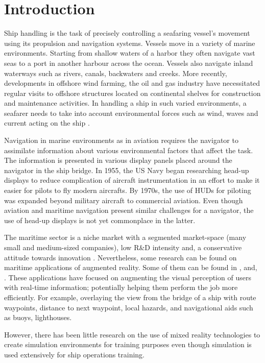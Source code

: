 \chapter{Introduction}

Ship handling is the task of precisely controlling a seafaring vessel’s movement using its propulsion and navigation systems. Vessels move in a variety of marine environments. Starting from shallow waters of a harbor they often navigate vast seas to a port in another harbour across the ocean. Vessels also navigate inland waterways such as rivers, canals, backwaters and creeks. More recently, developments in offshore wind farming, the oil and gas industry have necessitated regular visits to offshore structures located on continental shelves for construction and maintenance activities. In handling a ship in such varied environments, a seafarer needs to take into account environmental forces such as wind, waves and current acting on the ship \parencite{wiki:seamanship}.

Navigation in marine environments as in aviation requires the navigator to assimilate information about various environmental factors that affect the task. The information is presented in various display panels placed around the navigator in the ship bridge. In 1955, the US Navy began researching head-up displays to reduce complication of aircraft instrumentation in an effort to make it easier for pilots to fly modern aircrafts. By 1970s, the use of HUDs for piloting was expanded beyond military aircraft to commercial aviation. Even though aviation and maritime navigation present similar challenges for a navigator, the use of head-up displays is not yet commonplace in the latter. 

The maritime sector is a niche market with a segmented market-space (many small and medium-sized companies), low R\&D intensity and, a conservative attitude towards innovation \parencite{von2014maritime}. Nevertheless, some research can be found on maritime applications of augmented reality. Some of them can be found in \cite{hugues2010experimental}, \cite{vasiljevic2011augmented} and, \cite{von2014maritime}. These applications have focused on augmenting the visual perception of users with real-time information; potentially helping them perform the job more efficiently. For example, overlaying the view from the bridge of a ship with route waypoints, distance to next waypoint, local hazards, and navigational aids such as buoys, lighthouses. 

However, there has been little research on the use of mixed reality technologies to create simulation environments for training purposes even though simulation is used extensively for ship operations training.

